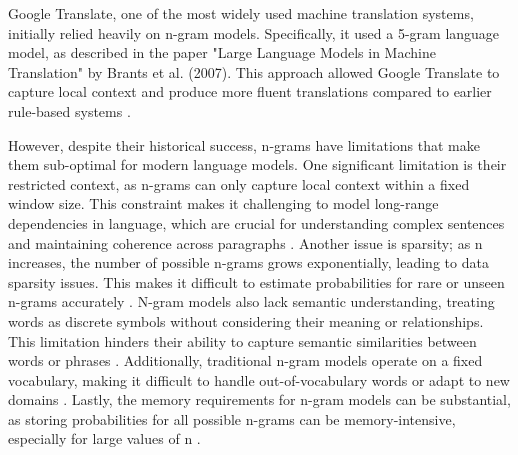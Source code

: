 \documentclass[a4paper, oneside]{discothesis}
\begin{document}
Google Translate, one of the most widely used machine translation systems, initially relied heavily on n-gram models. Specifically, it used a 5-gram language model, as described in the paper "Large Language Models in Machine Translation" by Brants et al. (2007). This approach allowed Google Translate to capture local context and produce more fluent translations compared to earlier rule-based systems \cite{brants2007large}.

However, despite their historical success, n-grams have limitations that make them sub-optimal for modern language models. One significant limitation is their restricted context, as n-grams can only capture local context within a fixed window size. This constraint makes it challenging to model long-range dependencies in language, which are crucial for understanding complex sentences and maintaining coherence across paragraphs \cite{bengio2003neural}. Another issue is sparsity; as n increases, the number of possible n-grams grows exponentially, leading to data sparsity issues. This makes it difficult to estimate probabilities for rare or unseen n-grams accurately \cite{katz1987estimation}. N-gram models also lack semantic understanding, treating words as discrete symbols without considering their meaning or relationships. This limitation hinders their ability to capture semantic similarities between words or phrases \cite{mikolov2013distributed}. Additionally, traditional n-gram models operate on a fixed vocabulary, making it difficult to handle out-of-vocabulary words or adapt to new domains \cite{jelinek1990self}. Lastly, the memory requirements for n-gram models can be substantial, as storing probabilities for all possible n-grams can be memory-intensive, especially for large values of n \cite{heafield2011kenlm}.

\end{document}
